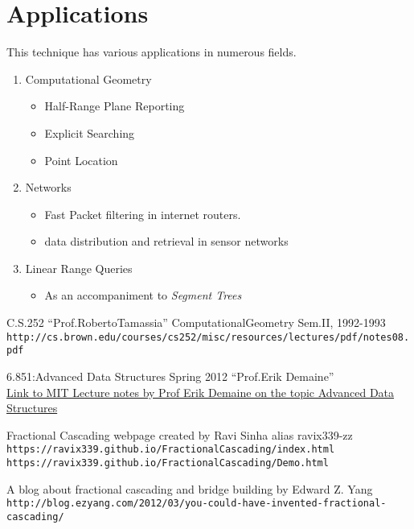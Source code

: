 \documentclass[11pt]{article}
\begin{document}


\section{Applications}
This technique has various applications in numerous fields. \\
\begin{enumerate}
    \item Computational Geometry
    \begin{itemize}
        \item Half-Range Plane Reporting
        \item Explicit Searching 
        \item Point Location
    \end{itemize}
    \item Networks
    \begin{itemize}
        \item Fast Packet filtering in internet routers.
        \item data distribution and retrieval in sensor networks
    \end{itemize}
    \item Linear Range Queries
        \begin{itemize}
            \item As an accompaniment to \textit{Segment Trees}
        \end{itemize}
\end{enumerate}



\pagebreak 
\begin{thebibliography}{}

C.S.252 ``Prof.RobertoTamassia'' ComputationalGeometry Sem.II, 1992-1993
\\
\texttt{http://cs.brown.edu/courses/cs252/misc/resources/lectures/pdf/notes08.pdf}


6.851:Advanced Data Structures Spring 2012 ``Prof.Erik Demaine'' \\
\href{https://ocw.mit.edu/courses/electrical-engineering-and-computer-science/6-851-advanced-data-structures-spring-2012/calendar-and-notes/MIT6_851S12_L3.pdf}{Link to MIT Lecture notes by Prof Erik Demaine on the topic Advanced Data Structures}


Fractional Cascading webpage created by Ravi Sinha alias ravix339-zz \\
\texttt{https://ravix339.github.io/FractionalCascading/index.html} \\
\texttt{https://ravix339.github.io/FractionalCascading/Demo.html}

A blog about fractional cascading and bridge building by Edward Z. Yang
\\\texttt{http://blog.ezyang.com/2012/03/you-could-have-invented-fractional-cascading/}


\end{thebibliography}
\end{document}
